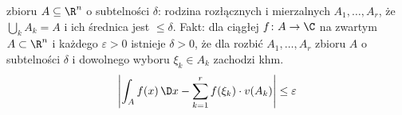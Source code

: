  zbioru $A \subseteq \R^n$ o subtelności $\delta$: rodzina rozłącznych i mierzalnych $A_1, \dots, A_r$, że $\bigcup_k A_k = A$ i ich średnica jest $\le \delta$.
Fakt: dla ciągłej $f \colon A \to \C$ na zwartym $A \subset \R^n$ i każdego $\varepsilon > 0$ istnieje $\delta > 0$, że dla rozbić $A_1, \dots, A_r$ zbioru $A$ o subtelności $\delta$ i dowolnego wyboru $\xi_k \in A_k$ zachodzi khm.
\[
	\left| \int_A f(x) \,\D x - \sum_{k=1}^r f(\xi_k) \cdot v(A_k) \right| \le \varepsilon
\]